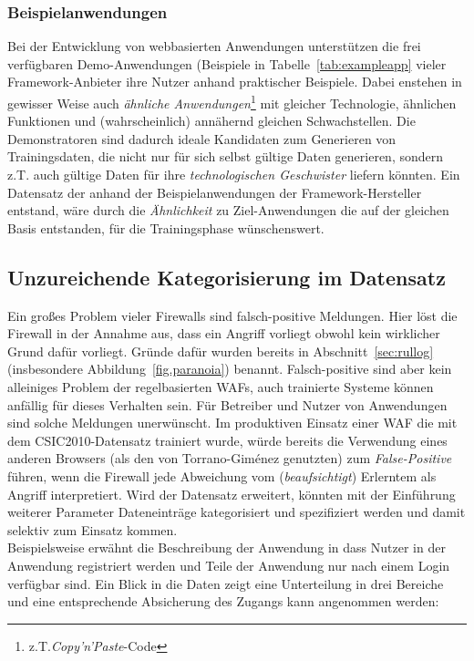 \subsubsection{Beispielanwendungen}
Bei der Entwicklung von webbasierten Anwendungen unterstützen die frei verfügbaren Demo-Anwendungen (Beispiele in Tabelle~\ref{tab:exampleapp} vieler Framework-Anbieter ihre Nutzer anhand praktischer Beispiele. Dabei enstehen in gewisser Weise auch \emph{ähnliche Anwendungen}\footnote{z.T.\emph{Copy'n'Paste}-Code} mit gleicher Technologie, ähnlichen Funktionen und (wahrscheinlich) annähernd gleichen Schwachstellen. Die Demonstratoren sind dadurch ideale Kandidaten zum Generieren von Trainingsdaten, die nicht nur für sich selbst gültige Daten generieren, sondern z.T. auch gültige Daten für ihre \glqq\emph{technologischen Geschwister}\glqq{} liefern könnten. Ein Datensatz der anhand der Beispielanwendungen der Framework-Hersteller entstand, wäre durch die \glqq\emph{Ähnlichkeit}\grqq{} zu Ziel-Anwendungen die auf der gleichen Basis entstanden, für die Trainingsphase wünschenswert.


\subsection{Unzureichende Kategorisierung im Datensatz}
\label{sec:Kategorisierung}
Ein großes Problem vieler Firewalls sind falsch-positive Meldungen. Hier löst die Firewall in der Annahme aus, dass ein Angriff vorliegt obwohl kein wirklicher Grund dafür vorliegt. Gründe dafür wurden bereits in Abschnitt~\ref{sec:rullog} (insbesondere Abbildung~\ref{fig.paranoia}) benannt. Falsch-positive sind aber kein alleiniges Problem der regelbasierten WAFs, auch trainierte Systeme können anfällig für dieses Verhalten sein. Für Betreiber und Nutzer von Anwendungen sind solche Meldungen unerwünscht. Im produktiven Einsatz einer WAF die mit dem CSIC2010-Datensatz trainiert wurde, würde bereits die Verwendung eines anderen Browsers (als den von Torrano-Giménez genutzten) zum \emph{False-Positive} führen, wenn die Firewall jede Abweichung vom (\emph{beaufsichtigt}) Erlerntem als Angriff interpretiert. Wird der Datensatz erweitert, könnten mit der Einführung weiterer Parameter Dateneinträge kategorisiert und spezifiziert werden und damit selektiv zum Einsatz kommen.\\ Beispielsweise erwähnt die Beschreibung der Anwendung in \cite{csic2010} dass Nutzer in der Anwendung registriert werden und Teile der Anwendung nur nach einem Login verfügbar sind. Ein Blick in die Daten zeigt eine Unterteilung in drei Bereiche und eine entsprechende Absicherung des Zugangs kann angenommen werden:\\ 

